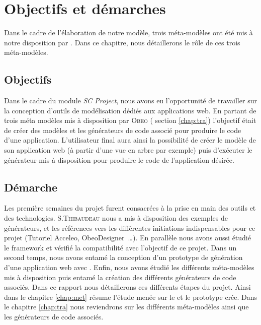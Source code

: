 \chapter{Objectifs et démarches}\label{chap:mod}
Dans le cadre de l'élaboration de notre modèle, trois méta-modèles ont été mis à notre disposition par \obeo. Dans ce chapitre, nous détaillerons le rôle de ces trois méta-modèles.


\section{Objectifs}
Dans le cadre du module \emph{SC Project}, nous avons eu l'opportunité de travailler sur la conception d'outils de modélisation dédiés aux applications web. En partant de trois méta modèles mis à disposition par \textsc{Obeo}
(\cf{} section \ref{chap:tra}) l'objectif était de créer des modèles et les générateurs de code associé pour produire le code d'une application. L'utilisateur final aura ainsi la possibilité de créer le modèle de son application web (à partir d'une vue en arbre par exemple) puis d'exécuter le générateur mis à disposition pour produire le code de l'application désirée.



\section{Démarche}
Les première semaines du projet furent consacrées à la prise en main des outils et des technologies. S.\textsc{Thibaudeau} nous a mis à disposition des exemples de générateurs, et les références vers les différentes initiations indispensables pour ce projet (Tutoriel Acceleo, ObeoDesigner~\dots). En parallèle nous avons aussi étudié le framework \play{} et vérifié la compatibilité avec l'objectif de ce projet. Dans un second temps, nous avons entamé la conception d'un prototype de génération d'une application web avec \play{}. Enfin, nous avons étudié les différents méta-modèles mis à disposition puis entamé la création des différents générateurs de code associés. Dans ce rapport nous détaillerons ces différents étapes du projet. Ainsi dans le chapitre \ref{chap:met} résume l'étude menée sur le \play{} et le prototype crée. Dans le chapitre \ref{chap:tra} nous reviendrons sur les différents méta-modèles ainsi que les générateurs de code associés. 



